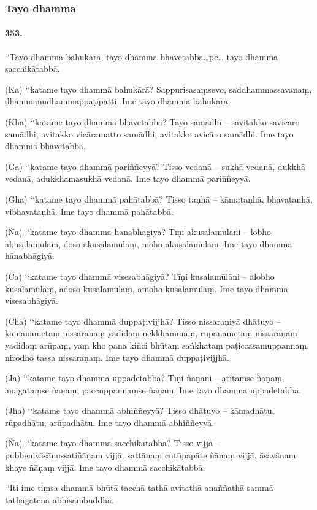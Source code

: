 \subsubsection{Tayo dhammā}

\paragraph{353.} ‘‘Tayo dhammā bahukārā, tayo dhammā bhāvetabbā…pe… tayo dhammā sacchikātabbā.

(Ka) ‘‘katame tayo dhammā bahukārā? Sappurisasaṃsevo, saddhammassavanaṃ, dhammānudhammappaṭipatti. Ime tayo dhammā bahukārā.

(Kha) ‘‘katame tayo dhammā bhāvetabbā? Tayo samādhī – savitakko savicāro samādhi, avitakko vicāramatto samādhi, avitakko avicāro samādhi. Ime tayo dhammā bhāvetabbā.

(Ga) ‘‘katame tayo dhammā pariññeyyā? Tisso vedanā – sukhā vedanā, dukkhā vedanā, adukkhamasukhā vedanā. Ime tayo dhammā pariññeyyā.

(Gha) ‘‘katame tayo dhammā pahātabbā? Tisso taṇhā – kāmataṇhā, bhavataṇhā, vibhavataṇhā. Ime tayo dhammā pahātabbā.

(Ṅa) ‘‘katame tayo dhammā hānabhāgiyā? Tīṇi akusalamūlāni – lobho akusalamūlaṃ, doso akusalamūlaṃ, moho akusalamūlaṃ. Ime tayo dhammā hānabhāgiyā.

(Ca) ‘‘katame tayo dhammā visesabhāgiyā? Tīṇi kusalamūlāni – alobho kusalamūlaṃ, adoso kusalamūlaṃ, amoho kusalamūlaṃ. Ime tayo dhammā visesabhāgiyā.

(Cha) ‘‘katame tayo dhammā duppaṭivijjhā? Tisso nissaraṇiyā dhātuyo – kāmānametaṃ nissaraṇaṃ yadidaṃ nekkhammaṃ, rūpānametaṃ nissaraṇaṃ yadidaṃ arūpaṃ, yaṃ kho pana kiñci bhūtaṃ saṅkhataṃ paṭiccasamuppannaṃ, nirodho tassa nissaraṇaṃ. Ime tayo dhammā duppaṭivijjhā.

(Ja) ‘‘katame tayo dhammā uppādetabbā? Tīṇi ñāṇāni – atītaṃse ñāṇaṃ, anāgataṃse ñāṇaṃ, paccuppannaṃse ñāṇaṃ. Ime tayo dhammā uppādetabbā.

(Jha) ‘‘katame tayo dhammā abhiññeyyā? Tisso dhātuyo – kāmadhātu, rūpadhātu, arūpadhātu. Ime tayo dhammā abhiññeyyā.

(Ña) ‘‘katame tayo dhammā sacchikātabbā? Tisso vijjā – pubbenivāsānussatiñāṇaṃ vijjā, sattānaṃ cutūpapāte ñāṇaṃ vijjā, āsavānaṃ khaye ñāṇaṃ vijjā. Ime tayo dhammā sacchikātabbā.

‘‘Iti ime tiṃsa dhammā bhūtā tacchā tathā avitathā anaññathā sammā tathāgatena abhisambuddhā.

